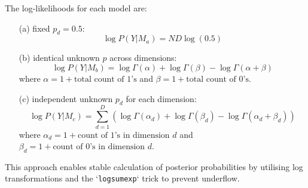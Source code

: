 \documentclass{article}
\begin{document}
    \noindent The log-likelihoods for each model are:

    \begin{enumerate}
        \item[(a)] fixed \( p_d = 0.5 \):
      \begin{equation}
          \log P(Y | M_a) = N D \log(0.5)
      \end{equation}
        \item[(b)] identical unknown \( p \) across dimensions:
      \begin{equation}
          \log P(Y | M_b) = \log \Gamma(\alpha) + \log \Gamma(\beta) - \log \Gamma(\alpha + \beta)
      \end{equation}
      where \( \alpha = 1 + \text{total count of 1's} \) and \( \beta = 1 + \text{total count of 0's} \).
        \item[(c)] independent unknown \( p_d \) for each dimension:
      \begin{equation}
          \log P(Y | M_c) = \sum_{d=1}^D \left( \log \Gamma(\alpha_d) + \log \Gamma(\beta_d) - \log \Gamma(\alpha_d + \beta_d) \right)
      \end{equation}
      where \( \alpha_d = 1 + \text{count of 1's in dimension } d \) and \( \beta_d = 1 + \text{count of 0's in dimension } d \).
    \end{enumerate}
    
    \noindent This approach enables stable calculation of posterior probabilities by utilising log transformations and the `\texttt{logsumexp}` trick to prevent underflow.
\end{document}
